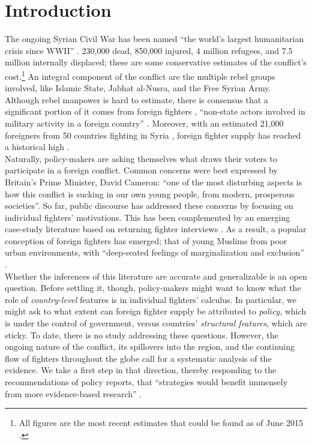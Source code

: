 \documentclass[12pt]{article}
\begin{document}
	\newpage
	\setcounter{page}{1} 			
	\onehalfspacing

\section{Introduction}

The ongoing Syrian Civil War has been named ``the world's largest humanitarian crisis since WWII'' \citep[p. 1]{ECHO2015}. 230,000 dead, 850,000 injured, 4 million refugees, and 7.5 million internally displaced; these are some conservative estimates of the conflict's cost.\footnote{All figures are the most recent estimates that could be found as of June 2015 \citep{UNOCHA2015}.} An integral component of the conflict are the multiple rebel groups involved, like Islamic State, Jabhat al-Nusra, and the Free Syrian Army. Although rebel manpower is hard to estimate, there is consensus that a significant portion of it comes from foreign fighters \citep{Byman2015}, ``non-state actors involved in military activity in a foreign country'' \citep[p. 1]{Hegghammer2013}. Moreover, with an estimated 21,000 foreigners from 50 countries fighting in Syria \citep{Neumann2015}, foreign fighter supply has reached a historical high \citep{Hegghammer2013a}. \\

Naturally, policy-makers are asking themselves what draws their voters to participate in a foreign conflict. Common concerns were best expressed by Britain's Prime Minister, David Cameron: ``one of the most disturbing aspects is how this conflict is sucking in our own young people, from modern, prosperous societies''. So far, public discourse has addressed these concerns by focusing on individual fighters' motivations. This has been complemented by an emerging case-study literature based on returning fighter interviews \citep{Stenersen2011, Weggemans2014, Nilsson2015}. As a result, a popular conception of foreign fighters has emerged; that of young Muslims from poor urban environments, with ``deep-seated feelings of marginalization and exclusion'' \citep[p. 2]{Noor2014}.  \\

Whether the inferences of this literature are accurate and generalizable is an open question. Before settling it, though, policy-makers might want to know what the role of \textit{country-level} features is in individual fighters' calculus. In particular, we might ask to what extent can foreign fighter supply be attributed to \textit{policy}, which is under the control of government, versus countries' \textit{structural features}, which are sticky. To date, there is no study addressing these questions. However, the ongoing nature of the conflict, its spillovers into the region, and the continuing flow of fighters throughout the globe call for a systematic analysis of the evidence. We take a first step in that direction, thereby responding to the recommendations of policy reports, that ``strategies would benefit immensely from more evidence-based research'' \citep[p. 17]{GCCS2014}. \\
\end{document}
